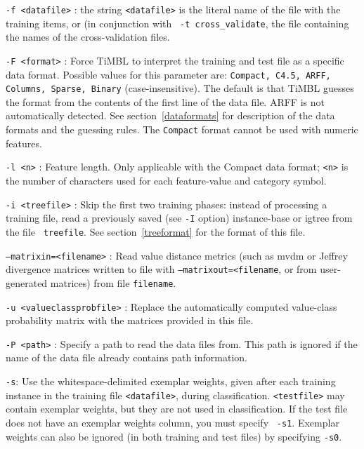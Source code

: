 \documentclass{report}
\begin{document}
\begin{description}

\item {\tt -f <datafile>} : the string {\tt <datafile>} is the literal
name of the file with the training items, or (in conjunction with {\tt
-t cross\_validate}, the file containing the names of the
cross-validation files.

\item {\tt -F <format>} : Force TiMBL to interpret the training and
test file as a specific data format. Possible values for this
parameter are: {\tt Compact, C4.5, ARFF, Columns, Sparse, Binary}
(case-insensitive). The default is that TiMBL guesses the format from
the contents of the first line of the data file. ARFF is not
automatically detected. See section~\ref{dataformats} for description
of the data formats and the guessing rules. The {\tt Compact} format
cannot be used with numeric features.

\item {\tt -l <n>} : Feature length. Only applicable with the Compact
  data format; {\tt <n>} is the number of characters used for each
  feature-value and category symbol.

\item {\tt -i <treefile>} : Skip the first two training phases:
  instead of processing a training file, read a previously saved (see
  {\tt -I} option) instance-base or {\sc igtree} from the file {\tt
    treefile}. See section~\ref{treeformat} for the format of this
  file.

\item {\tt --matrixin=<filename>} : Read value distance metrics (such
  as {\sc mvdm} or Jeffrey divergence matrices written to file with
  {\tt --matrixout=<filename}, or from user-generated matrices) from
  file {\tt filename}.

\item {\tt -u <valueclassprobfile>} : Replace the automatically
  computed value-class probability matrix with the matrices provided
  in this file.

\item {\tt -P <path>} : Specify a path to read the data files
  from. This path is ignored if the name of the data file already
  contains path information.

\item {\tt -s}: Use the whitespace-delimited exemplar weights, given
  after each training instance in the training file {\tt <datafile>},
  during classification. {\tt <testfile>} may contain exemplar
  weights, but they are not used in classification. If the test file
  does not have an exemplar weights column, you must specify {\tt
    -s1}. Exemplar weights can also be ignored (in both training and
  test files) by specifying {\tt -s0}.

\end{description}
\end{document}
